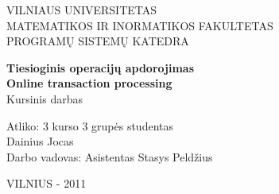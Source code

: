 \begin{titlepage}

\begin{center}
VILNIAUS UNIVERSITETAS\\
MATEMATIKOS IR INORMATIKOS FAKULTETAS\\
PROGRAMŲ SISTEMŲ KATEDRA\\
\vspace{100pt}

\huge \textbf{Tiesioginis operacijų apdorojimas\\}
\vspace{20pt}
\large\textbf{Online transaction processing\\}
\vspace{20pt}
\small Kursinis darbas\\
\vspace{20pt}
\end{center} 


\begin{flushleft}
Atliko:\hspace{65pt} 
3 kurso 3 grupės studentas\\
\hspace{100pt} Dainius Jocas\hspace{100pt} \\
\vspace{10pt}
Darbo vadovas:\hspace{20pt} Asistentas Stasys Peldžius \hspace{32pt} \\
\vspace{150pt}
\end{flushleft}

\begin{center}
VILNIUS - 2011
\end{center}

\end{titlepage}